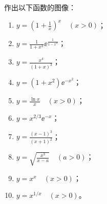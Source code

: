 \begin{xexercise}[3]
作出以下函数的图像：
  \begin{enumerate}[label=(\arabic*)]
    \item $\displaystyle y=\left(1+\frac1x\right)^x\quad(x>0)$；
    \item $\displaystyle y=\frac1{1+x^2}\ee^{\frac1{1-x^2}}$；
    \item $\displaystyle y=\frac{x^4}{(1+x)^3}$；
    \item $\displaystyle y=(1+x^2)\ee^{-x^2}$；
    \item $\displaystyle y=\frac{\ln x}{x}\quad(x>0)$；
    \item $\displaystyle y=x^{2/3}\ee^{-x}$；
    \item $\displaystyle y=\frac{(x-1)^3}{(x+1)^2}$；
    \item $\displaystyle y=\sqrt{\frac{x^3}{x-a}}\quad(a>0)$；
    \item $y=x^x\quad(x>0)$；
    \item $y=x^{1/x}\quad(x>0)$。
  \end{enumerate}
\end{xexercise}
